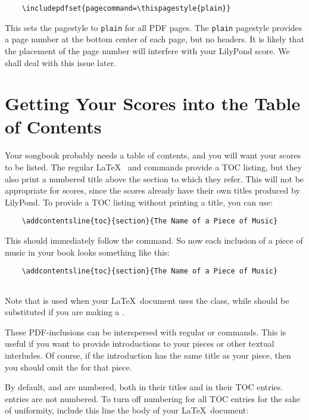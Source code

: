 \documentclass[../../LilyPond-Tutorials]{subfiles}
\begin{document}
\begin{verbatim}
	\includepdfset{pagecommand=\thispagestyle{plain}}
\end{verbatim}

This sets the pagestyle to \texttt{plain} for all PDF pages. 
The \texttt{plain} pagestyle provides a page number at the bottom center of each page, but no headers. 
It is likely that the placement of the page number will interfere with your LilyPond score. 
We shall deal with this issue later.

\section*{Getting Your Scores into the Table of Contents}

Your songbook probably needs a table of contents, and you will want your scores to be listed. 
The regular \LaTeX\  and  commands provide a TOC listing, but they also print a numbered title above the section to which they refer. 
This will not be appropriate for scores, since the scores already have their own titles produced by LilyPond. 
To provide a TOC listing without printing a title, you can use: 

\begin{verbatim}
	\addcontentsline{toc}{section}{The Name of a Piece of Music}
\end{verbatim}

This should immediately follow the  command. 
So now each inclusion of a piece of music in your book looks something like this:

\begin{verbatim}
	\addcontentsline{toc}{section}{The Name of a Piece of Music}
	
\end{verbatim}

Note that  is used when your \LaTeX\ document uses the  class, while  should be substituted if you are making a .

These PDF-inclusions can be interspersed with regular  or  commands. 
This is useful if you want to provide introductions to your pieces or other textual interludes. 
Of course, if the introduction has the same title as your piece, then you should omit the  for that piece.

By default,  and  are numbered, both in their titles and in their TOC entries. 
 entries are not numbered. 
To turn off numbering for all TOC entries for the sake of uniformity, include this line the body of your \LaTeX\ document:
\end{document}
